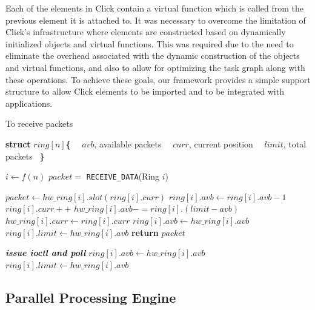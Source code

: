 \documentclass[10pt, conference, compsocconf, reqno]{IEEEtran}
\begin{document}
Each of the elements in Click contain a virtual function which is called from the previous element it is attached to. It was necessary to overcome the limitation of Click's infrastructure where elements are constructed based on dynamically initialized objects and virtual functions. This was required due to the need to eliminate the overhead associated with the dynamic construction of the objects and virtual functions, and also to allow for optimizing the task graph along with these operations. To achieve these goals, our framework provides a simple support structure to allow Click elements to be imported and to be integrated with applications.
\begin{algorithm}[h]
\caption{To receive packets}
\label{r_pack}
\begin{algorithmic}[1]

\State \textbf{struct} $ring[ n ]$\textbf{\{}
\State {}
\State {}
\State \  \  $avb$, available packets
\State \  \  $curr$, current position
\State \  \  $limit$, total packets \ \textbf{\}}

	\State $i \gets f( n ) $ \label{r_pack_param}
	\State $packet =$ \texttt{RECEIVE\_DATA}(Ring $i$)
\EndWhile
\EndFunction

	\State $packet \gets hw\_ring[ i ].slot( ring[ i ].curr ) $
	\State $ring[ i ].avb \gets ring[ i ].avb - 1$
	\State $ring[ i ].curr++$
	 \label{r_pack_thres}
		\State $hw\_ring[ i ].avb -= ring[ i ].( limit - avb)$
		\State $hw\_ring[ i ].curr \gets ring[ i ].curr$
		\State $ring[ i ].avb \gets hw\_ring[ i ].avb$
		\State $ring[ i ].limit \gets hw\_ring[ i ].avb$
	\EndIf
	\State \textbf{return} $packet$
\EndIf

\State \textbf{\textit{issue ioctl and poll}}
\State $ring[ i ].avb \gets hw\_ring[ i ].avb$
\State $ring[ i ].limit \gets hw\_ring[ i ].avb$
\EndFunction

\end{algorithmic}
\end{algorithm}
\subsection{Parallel Processing Engine}
\end{document}
